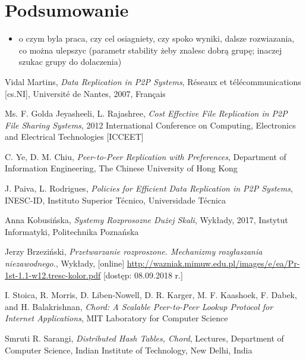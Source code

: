 \documentclass[12pt, twoside, openany]{report}
\begin{document}
\chapter{Podsumowanie}

\begin{itemize}
\item o czym byla praca, czy cel osiagniety, czy spoko wyniki, dalsze rozwiazania, co można ulepszyc (parametr stability żeby znalesc dobrą grupę; inaczej szukac grupy do dolaczenia)
\end{itemize}




\begin{thebibliography}{11}

 Vidal Martins, \emph{Data Replication in P2P Systems}, Réseaux et télécommunications [cs.NI], Université de Nantes, 2007, Français

 Ms. F. Golda Jeyasheeli, L. Rajashree, \emph{Cost Effective File Replication in P2P File Sharing Systems}, 2012 International Conference on Computing, Electronics and Electrical Technologies [ICCEET]
 
 C. Ye, D. M. Chiu, \emph{Peer-to-Peer Replication with Preferences}, Department of Information Engineering, The Chinese University of Hong Kong

 J. Paiva, L. Rodrigues, \emph{Policies for Efficient Data Replication in P2P Systems}, INESC-ID, Instituto Superior Técnico, Universidade Técnica

 Anna Kobusińska, \emph{Systemy Rozprosozne Dużej Skali}, Wykłady, 2017, Instytut Informatyki, Politechnika Poznańska

 Jerzy Brzeziński, \emph{Przetwarzanie rozproszone. Mechanizmy rozgłaszania niezawodnego.}, Wykłady, [online] \url{http://wazniak.mimuw.edu.pl/images/e/ea/Pr-1st-1.1-w12.tresc-kolor.pdf} [dostęp: 08.09.2018 r.]

  I. Stoica, R. Morris, D. Liben-Nowell, D. R. Karger, M. F. Kaashoek, F. Dabek, and H. Balakrishnan, \emph{Chord: A Scalable Peer-to-Peer Lookup Protocol for Internet Applications}, MIT Laboratory for Computer Science

 Smruti R. Sarangi, \emph{Distributed Hash Tables, Chord}, Lectures, Department of Computer Science, Indian Institute of Technology, New Delhi, India


\end{thebibliography}
\end{document}
